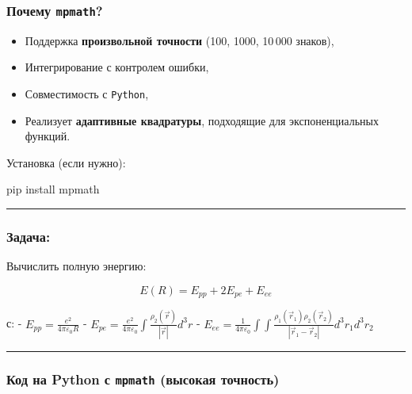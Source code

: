 \documentclass[11pt]{article}
\providecommand{\tightlist}{%
      \setlength{\itemsep}{0pt}\setlength{\parskip}{0pt}}
\newenvironment{Shaded}{}{}
\newcommand{\NormalTok}[1]{{#1}}
\newcommand{\ExtensionTok}[1]{{#1}}
\begin{document}
\subsubsection{\texorpdfstring{Почему
\texttt{mpmath}?}{Почему mpmath?}}\label{ux43fux43eux447ux435ux43cux443-mpmath}

\begin{itemize}
\tightlist
\item
  Поддержка \textbf{произвольной точности} (100, 1000, 10\,000 знаков),
\item
  Интегрирование с контролем ошибки,
\item
  Совместимость с \texttt{Python},
\item
  Реализует \textbf{адаптивные квадратуры}, подходящие для
  экспоненциальных функций.
\end{itemize}

Установка (если нужно):

\begin{Shaded}
\begin{Highlighting}[]
\ExtensionTok{pip}\NormalTok{ install mpmath}
\end{Highlighting}
\end{Shaded}

\begin{center}\rule{0.5\linewidth}{\linethickness}\end{center}

\subsubsection{Задача:}\label{ux437ux430ux434ux430ux447ux430}

Вычислить полную энергию:

\[
E(R) = E_{pp} + 2E_{pe} + E_{ee}
\]

с: - \(E_{pp} = \frac{e^2}{4\pi\varepsilon_0 R}\) -
\(E_{pe} = \frac{e^2}{4\pi\varepsilon_0} \int \frac{ \rho_2(\vec{r}) }{ |\vec{r}| } d^3r\)
-
\(E_{ee} = \frac{1}{4\pi\varepsilon_0} \int \int \frac{ \rho_1(\vec{r}_1) \rho_2(\vec{r}_2) }{ |\vec{r}_1 - \vec{r}_2| } d^3r_1 d^3r_2\)

\begin{center}\rule{0.5\linewidth}{\linethickness}\end{center}

\subsubsection{\texorpdfstring{Код на Python с \texttt{mpmath} (высокая
точность)}{Код на Python с mpmath (высокая точность)}}\label{ux43aux43eux434-ux43dux430-python-ux441-mpmath-ux432ux44bux441ux43eux43aux430ux44f-ux442ux43eux447ux43dux43eux441ux442ux44c}
\end{document}
